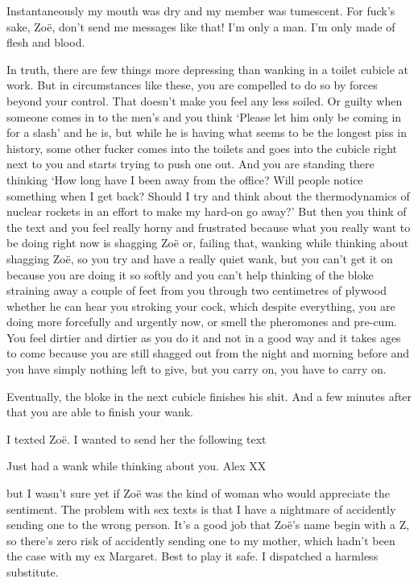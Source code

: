 Instantaneously my mouth was dry and my member was tumescent. For
fuck's sake, Zoë, don't send me messages like that! I'm only a
man. I'm only made of flesh and blood.

In truth, there are few things more depressing than wanking in a
toilet cubicle at work. But in circumstances like these, you are
compelled to do so by forces beyond your control. That doesn't make
you feel any less soiled. Or guilty when someone comes in to the
men's and you think `Please let him only be coming in for a slash'
and he is, but while he is having what seems to be the longest piss
in history, some other fucker comes into the toilets and goes into
the cubicle right next to you and starts trying to push one out. And
you are standing there thinking `How long have I been away from the
office? Will people notice something when I get back? Should I try
and think about the thermodynamics of nuclear rockets in an effort
to make my hard-on go away?' But then you think of the text and you
feel really horny and frustrated because what you really want to be
doing right now is shagging Zoë or, failing that, wanking while
thinking about shagging Zoë, so you try and have a really
{\twelveit quiet\/} wank, but you can't get it on because you are
doing it so softly and you can't help thinking of the bloke
straining away a couple of feet from you through two centimetres
of plywood whether he can hear you stroking your cock, which despite
everything, you are doing more forcefully and urgently now, or smell
the pheromones and pre-cum. You feel dirtier and dirtier as you do it
and not in a good way and it takes ages to come because you are
still shagged out from the night and morning before and you have
simply nothing left to give, but you carry on, you have to carry on.

Eventually, the bloke in the next cubicle finishes his shit. And a
few minutes after that you are able to finish your wank.

I texted Zoë. I wanted to send her the following text

\vskip 12pt
{\twelvett Just had a wank while thinking about you. Alex XX}
\vskip 12pt

but I wasn't sure yet if Zoë was the kind of woman who would
appreciate the sentiment. The problem with sex texts is that I have
a nightmare of accidently sending one to the wrong person. It's a
good job that Zoë's name begin with a Z, so there's zero risk of
accidently sending one to my mother, which hadn't been the case with
my ex Margaret. Best to play it safe. I dispatched a harmless
substitute.

